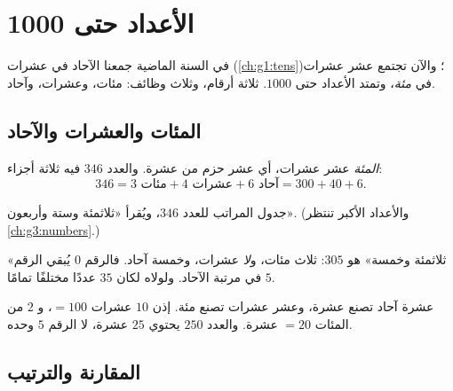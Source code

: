 \chapter{الأعداد حتى 1000}\label{ch:g2:numbers}

في السنة الماضية جمعنا الآحاد في عشرات (\cref{ch:g1:tens})؛ والآن
تجتمع عشر عشرات في \emph{مئة}، وتمتد الأعداد حتى
$1000$. ثلاثة أرقام، وثلاث وظائف: مئات، وعشرات، وآحاد.

\section{المئات والعشرات والآحاد}

\begin{definition}\label{def:g2:numbers:places}
\emph{المئة} عشر عشرات، أي عشر حزم من عشرة. والعدد
$346$ فيه ثلاثة أجزاء:
\[
346 = 3 \text{ مئات} + 4 \text{ عشرات} + 6 \text{ آحاد}
= 300 + 40 + 6 .
\]
\end{definition}

\begin{omfigure}

{\small جدول المراتب للعدد $346$، ويُقرأ «ثلاثمئة وستة وأربعون».
(والأعداد الأكبر تنتظر \cref{ch:g3:numbers}.)}
\end{omfigure}

\begin{example}\label{ex:g2:numbers:zero}
«ثلاثمئة وخمسة» هو $305$: ثلاث مئات، و\emph{لا} عشرات، وخمسة
آحاد. فالرقم $0$ يُبقي الرقم $5$ في مرتبة الآحاد. ولولاه لكان
$35$ عددًا مختلفًا تمامًا.
\end{example}

\begin{example}[التبديل]\label{ex:g2:numbers:exchange}
عشرة آحاد تصنع عشرة، وعشر عشرات تصنع مئة. إذن $10$ عشرات
$= 100$، و $2$ من المئات $= 20$ عشرة. والعدد $250$ يحتوي
$25$ عشرة، لا الرقم $5$ وحده.
\end{example}

\section{المقارنة والترتيب}


